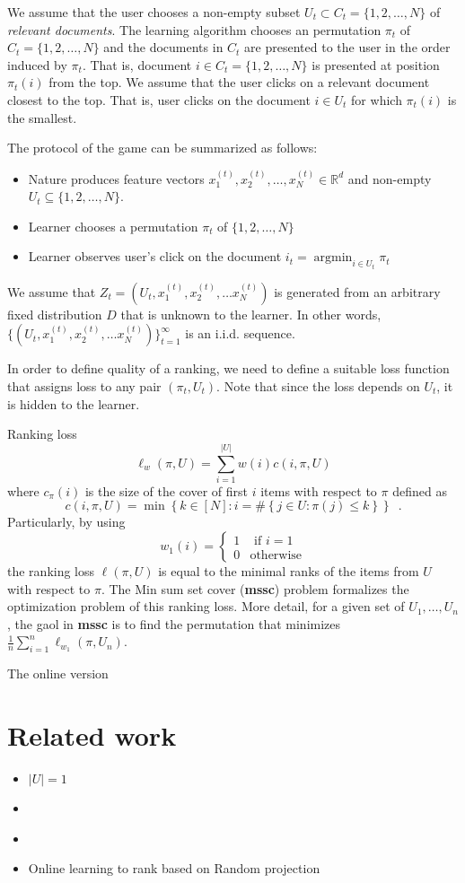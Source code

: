 \documentclass{article}
\newcommand{\R}{\mathbb{R}}
\DeclareMathOperator*{\argmin}{argmin}
\begin{document}
We assume that the user chooses a non-empty subset $U_t
\subset C_t = \{1,2,\dots,N\}$ of \emph{relevant documents}. The learning
algorithm chooses an permutation $\pi_t$ of $C_t = \{1,2,\dots,N\}$ and the
documents in $C_t$ are presented to the user in the order induced by $\pi_t$.
That is, document $i \in C_t = \{1,2,\dots,N\}$ is presented at position
$\pi_t(i)$ from the top. We assume that the user clicks on a relevant document
closest to the top. That is, user clicks on the document $i \in U_t$ for which
$\pi_t(i)$ is the smallest.

The protocol of the game can be summarized as follows:

\begin{itemize}
\item Nature produces feature vectors
$x^{(t)}_1, x^{(t)}_2, \dots, x^{(t)}_N \in \R^d$
and non-empty $U_t \subseteq \{1,2,\dots,N\}$.
\item Learner chooses a permutation $\pi_t$ of $\{1,2,\dots,N\}$
\item Learner observes user's click on the document $i_t = \argmin_{i \in U_t} \pi_t$
\end{itemize}

We assume that $Z_t = (U_t, x_1^{(t)}, x_2^{(t)}, \dots x_N^{(t)})$ is generated from
an arbitrary fixed distribution $D$ that is unknown to the learner.
In other words, $\{(U_t, x_1^{(t)}, x_2^{(t)}, \dots
x_N^{(t)})\}_{t=1}^\infty$ is an i.i.d. sequence.

In order to define quality of a ranking, we need to define a suitable loss
function that assigns loss to any pair $(\pi_t, U_t)$. Note that since the loss
depends on $U_t$, it is hidden to the learner.

Ranking loss
\[
\ell_w ( \pi , U ) = \sum_{i=1}^{| U |} w(i) c(i, \pi, U)
\]
where $c_{\pi}(i)$ is the size of the cover of first $i$ items with respect to $\pi$ defined as
\[
c(i, \pi, U ) = \min \left\{ k\in [N] : i = \#\left\{ j \in U : \pi(j) \le k\right\} \right\} \enspace .
\]
Particularly, by using
\[
w_1 ( i )  = 
\begin{cases}
1 & \mbox{ if } i = 1 \\
0 & \mbox{otherwise}
\end{cases}
\]
the ranking loss $\ell ( \pi , U )$ is equal to the minimal ranks of the items from $U$ with respect to $\pi$. The Min sum set cover ({\bf mssc}) problem formalizes the optimization problem of this ranking loss. More detail, for a given set of $U_1, \dots, U_n$, the gaol in {\bf mssc} is to find the permutation that minimizes
$\tfrac{1}{n}\sum_{i=1}^{n} \ell_{w_1} ( \pi, U_n )$.

The online version

\section{Related work}

\begin{itemize}
	\item \cite{Ail14} $| U| =1 $
	\item \cite{RaKlJo08}
	\item \cite{AzarGY09}
	\item Online learning to rank based on Random projection \cite{SchuthOWR16}
\end{itemize}

{}

\end{document}
